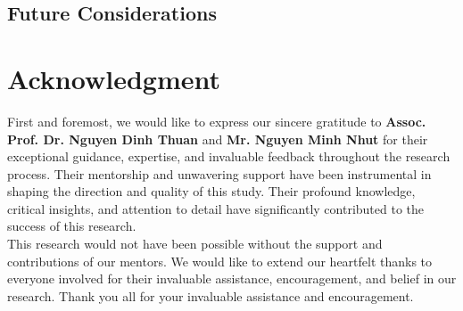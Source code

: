 \documentclass{ieeeojies}
\begin{document}
	\subsection{Future Considerations}
	\section*{Acknowledgment}
	First and foremost, we would like to express our sincere gratitude to \textbf{Assoc. Prof. Dr. Nguyen Dinh Thuan} and \textbf{Mr. Nguyen Minh Nhut} for their exceptional guidance, expertise, and invaluable feedback throughout the research process. Their mentorship and unwavering support have been instrumental in shaping the direction and quality of this study. Their profound knowledge, critical insights, and attention to detail have significantly contributed to the success of this research.
	\\This research would not have been possible without the support and contributions of our mentors. We would like to extend our heartfelt thanks to everyone involved for their invaluable assistance, encouragement, and belief in our research. Thank you all for your invaluable assistance and encouragement.
	
\end{document}
